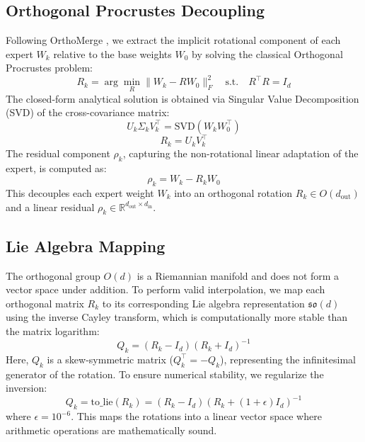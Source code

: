 \documentclass{article}
\theoremstyle{plain}
\theoremstyle{definition}
\theoremstyle{remark}
\begin{document}
\subsection{Orthogonal Procrustes Decoupling}
Following OrthoMerge \cite{orthomerge2026orthogonal}, we extract the implicit rotational component of each expert $W_k$ relative to the base weights $W_0$ by solving the classical Orthogonal Procrustes problem:
\begin{equation}
R_k = \arg\min_R \|W_k - R W_0\|_F^2 \quad \text{s.t.} \quad R^\top R = I_d
\end{equation}
The closed-form analytical solution is obtained via Singular Value Decomposition (SVD) of the cross-covariance matrix:
\begin{equation}
U_k \Sigma_k V_k^\top = \text{SVD}(W_k W_0^\top)
\end{equation}
\begin{equation}
R_k = U_k V_k^\top
\end{equation}
The residual component $\rho_k$, capturing the non-rotational linear adaptation of the expert, is computed as:
\begin{equation}
\rho_k = W_k - R_k W_0
\end{equation}
This decouples each expert weight $W_k$ into an orthogonal rotation $R_k \in O(d_{\text{out}})$ and a linear residual $\rho_k \in \mathbb{R}^{d_{\text{out}} \times d_{\text{in}}}$.

\subsection{Lie Algebra Mapping}
The orthogonal group $O(d)$ is a Riemannian manifold and does not form a vector space under addition. To perform valid interpolation, we map each orthogonal matrix $R_k$ to its corresponding Lie algebra representation $\mathfrak{so}(d)$ using the inverse Cayley transform, which is computationally more stable than the matrix logarithm:
\begin{equation}
Q_k = (R_k - I_d)(R_k + I_d)^{-1}
\end{equation}
Here, $Q_k$ is a skew-symmetric matrix ($Q_k^\top = -Q_k$), representing the infinitesimal generator of the rotation. To ensure numerical stability, we regularize the inversion:
\begin{equation}
Q_k = \text{to\_lie}(R_k) = (R_k - I_d)(R_k + (1+\epsilon)I_d)^{-1}
\end{equation}
where $\epsilon = 10^{-6}$. This maps the rotations into a linear vector space where arithmetic operations are mathematically sound.
\end{document}
